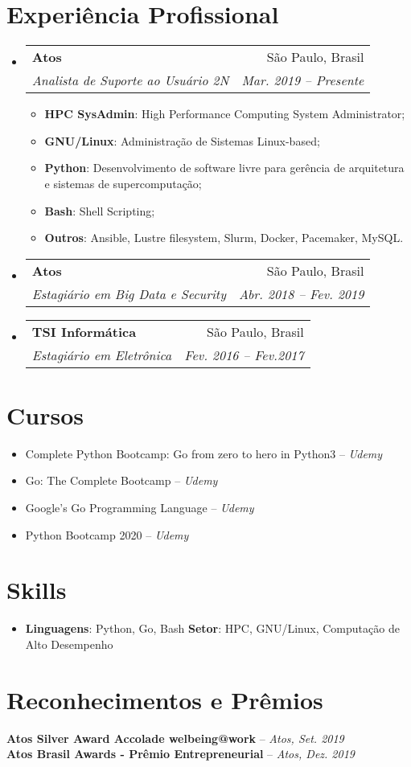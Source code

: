 \documentclass[letterpaper,11pt]{article}
\makeatletter
\newcommand{\resumeItem}[2]{
  \item\small{
    \textbf{#1}{: #2 \vspace{-2pt}}
  }
}
\newcommand{\resumeSubheading}[4]{
  \vspace{-1pt}\item
    \begin{tabular*}{0.97\textwidth}[t]{l@{\extracolsep{\fill}}r}
      \textbf{#1} & #2 \\
      \textit{\small#3} & \textit{\small #4} \\
    \end{tabular*}\vspace{-5pt}
}
\newcommand{\resumeSubHeadingListStart}{\begin{itemize}[leftmargin=*]}
\newcommand{\resumeSubHeadingListEnd}{\end{itemize}}
\newcommand{\resumeItemListStart}{\begin{itemize}}
\newcommand{\resumeItemListEnd}{\end{itemize}\vspace{-5pt}}
\makeatother
\begin{document}
\section{Experiência Profissional}
  \resumeSubHeadingListStart

    \resumeSubheading
      {Atos}{São Paulo, Brasil}
      {Analista de Suporte ao Usuário 2N}{Mar. 2019 -- Presente}
      \resumeItemListStart
      \resumeItem{HPC SysAdmin}
      {High Performance Computing System Administrator;}
      \resumeItem{GNU/Linux}
      {Administração de Sistemas Linux-based;}
      \resumeItem{Python}
      {Desenvolvimento de software livre para gerência de arquitetura e sistemas de supercomputação;}
      \resumeItem{Bash}
      {Shell Scripting;}
      \resumeItem{Outros}
      {Ansible, Lustre filesystem, Slurm, Docker, Pacemaker, MySQL.}
      \resumeItemListEnd
    
    {\vspace{2pt}}
             
    \resumeSubheading
      {Atos}{São Paulo, Brasil}
      {Estagiário em Big Data e Security}{Abr. 2018 -- Fev. 2019}

	{\vspace{2pt}}

    \resumeSubheading
      {TSI Informática}{São Paulo, Brasil}
      {Estagiário em Eletrônica}{Fev. 2016 -- Fev.2017}  

  \resumeSubHeadingListEnd
  
\section{Cursos}
\begin{itemize}
	\item Complete Python Bootcamp: Go from zero to hero in Python3 --
		\emph{Udemy}
	\item Go: The Complete Bootcamp --
			\emph{Udemy}
	\item Google's Go Programming Language --
		\emph{Udemy}
	\item Python Bootcamp 2020 --
		\emph{Udemy}
\end{itemize}

\section{Skills}

    {\vspace{2pt}}
    
  \resumeSubHeadingListStart
     \item{
     	\textbf{Linguagens}{: Python, Go, Bash}
      \hfill
      	\textbf{Setor}{: HPC, GNU/Linux, Computação de Alto Desempenho}
      \hfill
    }
  \resumeSubHeadingListEnd

\section{Reconhecimentos e Prêmios}

	{\vspace{2pt}}

	\textbf{Atos Silver Award Accolade welbeing@work} -- \small\emph{Atos, Set. 2019}\\
	\textbf{Atos Brasil Awards - Prêmio Entrepreneurial} -- \small\emph{Atos, Dez. 2019}
\end{document}
